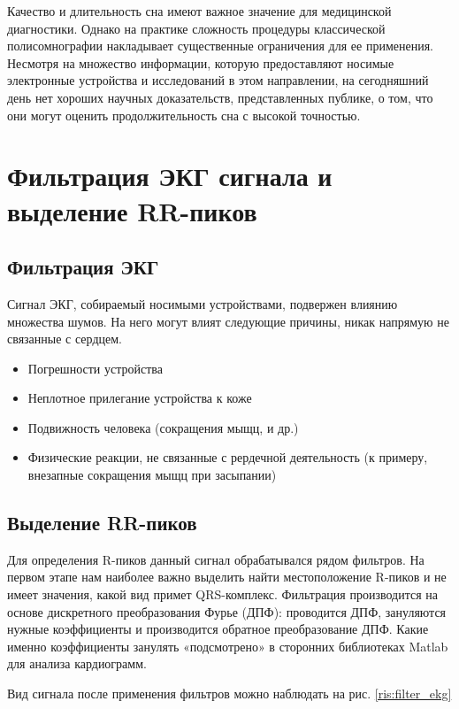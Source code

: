 Качество и длительность сна имеют важное значение для медицинской диагностики. Однако на практике сложность процедуры классической полисомнографии накладывает существенные ограничения для ее применения. Несмотря на множество информации, которую предоставляют носимые электронные устройства и исследований в этом направлении, на сегодняшний день нет хороших научных доказательств, представленных публике, о том, что они могут оценить продолжительность сна с высокой точностью.

\section{Фильтрация ЭКГ сигнала и выделение RR-пиков}
\subsection{Фильтрация ЭКГ}
Сигнал ЭКГ, собираемый носимыми устройствами, подвержен влиянию множества шумов. На него могут влият следующие причины, никак напрямую не связанные с сердцем.
\begin{itemize}
	\item Погрешности устройства
	\item Неплотное прилегание устройства к коже
	\item Подвижность человека (сокращения мыщц, и др.)
	\item Физические реакции, не связанные с рердечной деятельность (к примеру, внезапные сокращения мыщц при засыпании)
\end{itemize}

\subsection{Выделение RR-пиков}
Для определения R-пиков данный сигнал обрабатывался рядом фильтров. На первом этапе нам наиболее важно выделить найти местоположение R-пиков и не имеет значения, какой вид примет QRS-комплекс. Фильтрация производится на основе дискретного преобразования Фурье (ДПФ): проводится ДПФ, зануляются нужные коэффициенты и производится обратное преобразование ДПФ. Какие именно коэффициенты занулять «подсмотрено» в сторонних библиотеках Matlab для анализа кардиограмм.

Вид сигнала после применения фильтров можно наблюдать на рис.  \ref{ris:filter_ekg}

